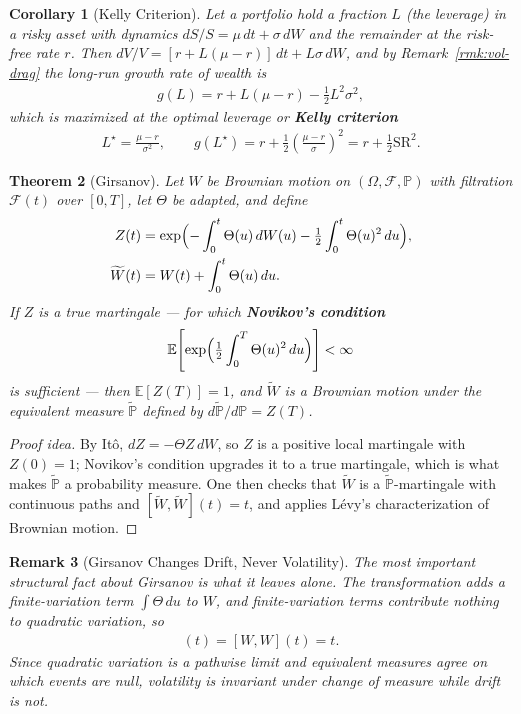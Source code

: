 \documentclass{report}
\theoremstyle{spacedplain}
\newtheorem{theorem}{Theorem}[section]
\newtheorem{corollary}[theorem]{Corollary}
\theoremstyle{spaceddefinition}
\theoremstyle{spacedremark}
\newtheorem{remark}[theorem]{Remark}
\begin{document}
\begin{corollary}[Kelly Criterion]
Let a portfolio hold a fraction $L$ (the leverage) in a risky asset with dynamics $dS/S = \mu\,dt+\sigma\,dW$ and the remainder at the risk-free rate $r$. Then $dV/V = [r + L(\mu-r)]\,dt + L\sigma\,dW$, and by Remark~\ref{rmk:vol-drag} the long-run growth rate of wealth is
\begin{align}
    g(L) = r + L(\mu - r) - \tfrac12 L^2\sigma^2,
\end{align}
which is maximized at the optimal leverage or \textbf{Kelly criterion}
\begin{align}
    L^\star = \frac{\mu-r}{\sigma^2}, \qquad g(L^\star) = r + \frac{1}{2}\left(\frac{\mu-r}{\sigma}\right)^{\!2} = r + \tfrac12 \mathrm{SR}^2 .
\end{align}
\end{corollary}

\begin{theorem}[Girsanov]
Let $W$ be Brownian motion on $(\Omega,\mathcal{F},\mathbb{P})$ with filtration $\mathcal{F}(t)$ over $[0,T]$, let $\Theta$ be adapted, and define
\begin{align}
    Z(t) &= \exp\Bigl(-\int_0^t \Theta(u)\, dW(u) - \tfrac{1}{2}\int_0^t \Theta(u)^2\, du\Bigr), \\
    \widetilde{W}(t) &= W(t) + \int_0^t \Theta(u)\, du.
\end{align}
If $Z$ is a true martingale --- for which \textbf{Novikov's condition}
\begin{align}
    \mathbb{E}\!\left[\exp\Bigl(\tfrac12\int_0^T\Theta(u)^2\,du\Bigr)\right] < \infty
\end{align}
is sufficient --- then $\mathbb{E}[Z(T)] = 1$, and $\widetilde{W}$ is a Brownian motion under the equivalent measure $\widetilde{\mathbb{P}}$ defined by $d\widetilde{\mathbb{P}}/d\mathbb{P} = Z(T)$.
\end{theorem}
\begin{proof}[Proof idea]
By It\^o, $dZ = -\Theta Z\,dW$, so $Z$ is a positive local martingale with $Z(0)=1$; Novikov's condition upgrades it to a true martingale, which is what makes $\widetilde{\mathbb{P}}$ a probability measure. One then checks that $\widetilde{W}$ is a $\widetilde{\mathbb{P}}$-martingale with continuous paths and $[\widetilde{W},\widetilde{W}](t)=t$, and applies L\'evy's characterization of Brownian motion.
\end{proof}

\begin{remark}[Girsanov Changes Drift, Never Volatility]\label{rmk:girsanov-vol}
The most important structural fact about Girsanov is what it leaves alone. The transformation adds a finite-variation term $\int\Theta\,du$ to $W$, and finite-variation terms contribute nothing to quadratic variation, so
\begin{align}
    [\widetilde{W},\widetilde{W}](t) = [W,W](t) = t .
\end{align}
Since quadratic variation is a pathwise limit and equivalent measures agree on which events are null, \emph{volatility is invariant under change of measure} while drift is not.
\end{remark}
\end{document}
